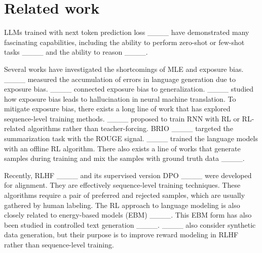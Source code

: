 \section{Related work}
LLMs trained with next token prediction loss ____ have demonstrated many fascinating capabilities, including the ability to perform zero-shot or few-shot tasks ____ and the ability to reason ____. 

Several works have investigated the shortcomings of MLE and exposure bias. ____ measured the accumulation of errors in language generation due to exposure bias. ____ connected exposure bias to generalization. ____ studied how exposure bias leads to hallucination in neural machine translation. To mitigate exposure bias, there exists a long line of work that has explored sequence-level training methods. ____ proposed to train RNN with RL or RL-related algorithms rather than teacher-forcing. BRIO ____ targeted the summarization task with the ROUGE signal. ____ trained the language models with an offline RL algorithm. There also exists a line of works that generate samples during training and mix the samples with ground truth data ____. 

Recently, RLHF ____ and its supervised version DPO ____ were developed for alignment. They are effectively sequence-level training techniques. These algorithms require a pair of preferred and rejected samples, which are usually gathered by human labeling. The RL approach to language modeling is also closely related to energy-based models (EBM) ____. This EBM form has also been studied in controlled text generation ____. ____ also consider synthetic data generation, but their purpose is to improve reward modeling in RLHF rather than sequence-level training. 
